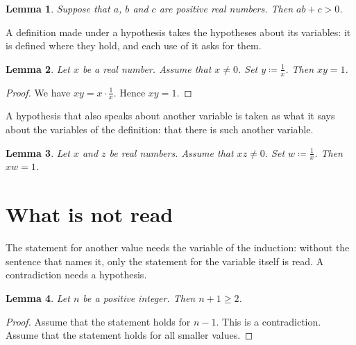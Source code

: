 \documentclass{article}
\newtheorem{lemma}{Lemma}
\begin{document}
\begin{lemma}\label{lem:supposed}
Suppose that $a$, $b$ and $c$ are positive real numbers.
Then $ab+c>0$.
\end{lemma}

A definition made under a hypothesis takes the hypotheses about its variables: it is defined where they hold, and each use of it asks for them.

\begin{lemma}\label{lem:inverse}
Let $x$ be a real number.
Assume that $x\ne0$.
Set $y\coloneqq\frac1x$.
Then $xy=1$.
\end{lemma}

\begin{proof}
We have $xy=x\cdot\frac1x$.
Hence $xy=1$.
\end{proof}

A hypothesis that also speaks about another variable is taken as what it says about the variables of the definition: that there is such another variable.

\begin{lemma}\label{lem:inverse-product}
Let $x$ and $z$ be real numbers.
Assume that $xz\ne0$.
Set $w\coloneqq\frac1x$.
Then $xw=1$.
\end{lemma}

\section{What is not read}

The statement for another value needs the variable of the induction: without the sentence that names it, only the statement for the variable itself is read.
A contradiction needs a hypothesis.

\begin{lemma}\label{lem:unnamed}
Let $n$ be a positive integer.
Then $n+1\ge2$.
\end{lemma}

\begin{proof}
Assume that the statement holds for $n-1$.
This is a contradiction.
Assume that the statement holds for all smaller values.
\end{proof}
\end{document}
